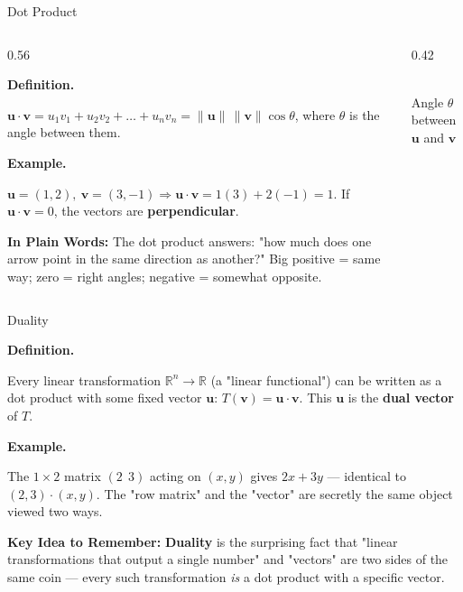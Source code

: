 \documentclass[9pt,aspectratio=169]{beamer}
\newcommand{\keyidea}[1]{%
\par\medskip\noindent\textbf{Key Idea to Remember:} #1\par\medskip}
\newcommand{\childex}[1]{%
\par\medskip\noindent\textbf{In Plain Words:} #1\par\medskip}
\begin{document}
\begin{frame}{Dot Product}
\begin{columns}[T]
\begin{column}{0.56\textwidth}
\par\noindent\textbf{Definition.}\par
$\mathbf{u}\cdot\mathbf{v} = u_1v_1 + u_2v_2 + \dots + u_nv_n =
\|\mathbf{u}\|\,\|\mathbf{v}\|\cos\theta$, where $\theta$ is the angle between them.
\medskip

\par\noindent\textbf{Example.}\par
$\mathbf{u}=(1,2),\ \mathbf{v}=(3,-1) \Rightarrow \mathbf{u}\cdot\mathbf{v}=1(3)+2(-1)=1$.
If $\mathbf{u}\cdot\mathbf{v}=0$, the vectors are \textbf{perpendicular}.
\medskip

\childex{The dot product answers: "how much does one arrow point in the same direction as
another?" Big positive = same way; zero = right angles; negative = somewhat opposite.}
\end{column}
\begin{column}{0.42\textwidth}
\centering
{}
\\[0.3em]{\scriptsize Angle $\theta$ between $\mathbf{u}$ and $\mathbf{v}$}
\end{column}
\end{columns}
\end{frame}

\begin{frame}{Duality}
\par\noindent\textbf{Definition.}\par
Every linear transformation $\mathbb{R}^n \to \mathbb{R}$ (a "linear functional") can be
written as a dot product with some fixed vector $\mathbf{u}$: $T(\mathbf{v}) =
\mathbf{u}\cdot\mathbf{v}$. This $\mathbf{u}$ is the \textbf{dual vector} of $T$.
\medskip


\par\noindent\textbf{Example.}\par
The $1\times 2$ matrix $(2\ \ 3)$ acting on $(x,y)$ gives $2x+3y$ --- identical to
$(2,3)\cdot(x,y)$. The "row matrix" and the "vector" are secretly the same object viewed
two ways.
\medskip


\keyidea{\textbf{Duality} is the surprising fact that "linear transformations that output
a single number" and "vectors" are two sides of the same coin --- every such
transformation \emph{is} a dot product with a specific vector.}
\end{frame}
\end{document}
